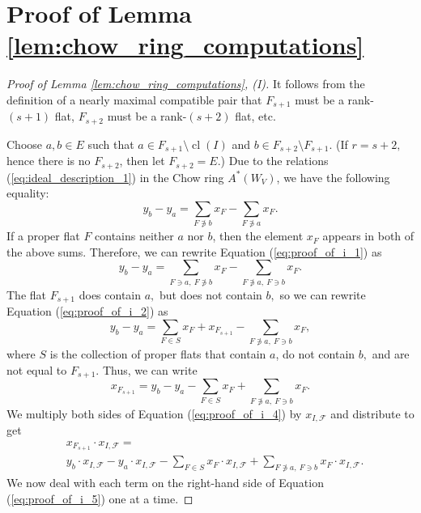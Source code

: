\documentclass{amsart}
\theoremstyle{plain}
\theoremstyle{definition}
\newcommand{\cl}{\operatorname{cl}}
\begin{document}
\section{Proof of Lemma \ref{lem:chow_ring_computations}}
\begin{proof}[Proof of Lemma \ref{lem:chow_ring_computations}, (I)]
It follows from the definition of a nearly maximal compatible pair that $F_{s+1}$ must be a rank-$(s+1)$ flat, $F_{s+2}$ must be a rank-$(s+2)$ flat, etc. 

Choose $a,b \in E$ such that $a \in F_{s+1} \setminus \cl(I)$ and $b \in F_{s+2} \setminus F_{s+1}.$ (If $r= s+2,$ hence there is no $F_{s+2}$, then let $F_{s+2} = E.$) Due to the relations (\ref{eq:ideal_description_1}) in the Chow ring $A^*(W_V)$, we have the following equality:
\begin{equation}
\label{eq:proof_of_i_1}
y_b - y_a = \sum_{F \not\ni b}x_F - \sum_{F \not\ni a}x_F.
\end{equation}
If a proper flat $F$ contains neither $a$ nor $b$, then the element $x_F$ appears in both of the above sums. Therefore, we can rewrite Equation (\ref{eq:proof_of_i_1}) as
\begin{equation}
\label{eq:proof_of_i_2}
y_b - y_a = \sum_{F \ni a,\: F \not\ni b}x_F - \sum_{F \not\ni a,\: F \ni b}x_F.
\end{equation}
The flat $F_{s+1}$ does contain $a,$ but does not contain $b,$ so we can rewrite Equation (\ref{eq:proof_of_i_2}) as
\begin{equation*}
\label{eq:proof_of_i_3}
y_b - y_a  = \sum_{F \in S}x_F  + x_{F_{s+1}}- \sum_{F \not\ni a,\: F \ni b}x_F,
\end{equation*}
where $S$ is the collection of proper flats that contain $a$, do not contain $b,$ and are not equal to $F_{s+1}$.
Thus, we can write
\begin{equation}
\label{eq:proof_of_i_4}
x_{F_{s+1}} = y_b - y_a  - \sum_{F \in S}x_F  + \sum_{F \not\ni a,\: F \ni b}x_F.
\end{equation}
We multiply both sides of Equation (\ref{eq:proof_of_i_4}) by $x_{I, \mathscr{F}}$ and distribute to get
\begin{equation}
\label{eq:proof_of_i_5}
\begin{split}
& x_{F_{s+1}} \cdot x_{I , \mathscr{F}} = \\ & y_b \cdot x_{I , \mathscr{F}} - y_a \cdot x_{I , \mathscr{F}}  - \sum_{F \in S}x_F \cdot x_{I , \mathscr{F}}  + \sum_{F \not\ni a,\: F \ni b}x_F \cdot x_{I , \mathscr{F}}.
\end{split}
\end{equation}
We now deal with each term on the right-hand side of Equation (\ref{eq:proof_of_i_5}) one at a time. 


\end{proof}
\end{document}
